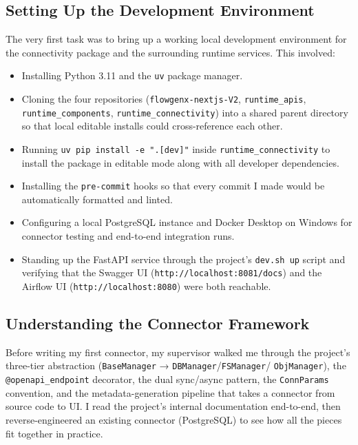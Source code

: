 \subsection{Setting Up the Development Environment}
The very first task was to bring up a working local development
environment for the connectivity package and the surrounding runtime
services. This involved:

\begin{itemize}[leftmargin=*]
    \item Installing Python 3.11 and the \texttt{uv} package manager.
    \item Cloning the four repositories
    (\texttt{flowgenx-nextjs-V2}, \texttt{runtime\_apis},
    \texttt{runtime\_components}, \texttt{runtime\_connectivity}) into
    a shared parent directory so that local editable installs could
    cross-reference each other.
    \item Running \texttt{uv pip install -e ".[dev]"} inside
    \texttt{runtime\_connectivity} to install the package in editable
    mode along with all developer dependencies.
    \item Installing the \texttt{pre-commit} hooks so that every
    commit I made would be automatically formatted and linted.
    \item Configuring a local PostgreSQL instance and Docker Desktop
    on Windows for connector testing and end-to-end integration runs.
    \item Standing up the FastAPI service through the project's
    \texttt{dev.sh up} script and verifying that the Swagger UI
    (\texttt{http://localhost:8081/docs}) and the Airflow UI
    (\texttt{http://localhost:8080}) were both reachable.
\end{itemize}

\subsection{Understanding the Connector Framework}
Before writing my first connector, my supervisor walked me through
the project's three-tier abstraction
(\texttt{BaseManager} → \texttt{DBManager}/\texttt{FSManager}/%
\texttt{ObjManager}), the \texttt{@openapi\_endpoint} decorator, the
dual sync/async pattern, the \texttt{ConnParams} convention, and the
metadata-generation pipeline that takes a connector from source code
to UI. I read the project's internal documentation end-to-end, then
reverse-engineered an existing connector
(PostgreSQL) to see how all the pieces fit together in practice.

